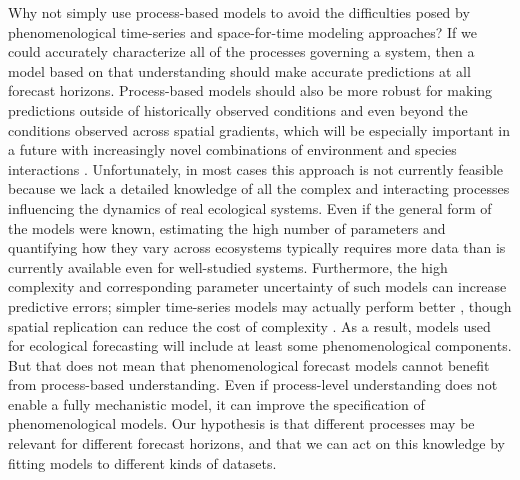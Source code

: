\documentclass[11pt]{article}
\begin{document}
Why not simply use process-based models to avoid the difficulties posed by phenomenological time-series and space-for-time modeling approaches? If we could accurately characterize all of the processes governing a system, then a model based on that understanding should make accurate predictions at all forecast horizons. Process-based models should also be more robust for making predictions outside of historically observed conditions and even beyond the conditions observed across spatial gradients, which will be especially important in a future with increasingly novel combinations of environment and species interactions \citep{Williams2007}. Unfortunately, in most cases this approach is not currently feasible because we lack a detailed knowledge of all the complex and interacting processes influencing the dynamics of real ecological systems. Even if the general form of the models were known, estimating the high number of parameters and quantifying how they vary across ecosystems typically requires more data than is currently available even for well-studied systems. Furthermore, the high complexity and corresponding parameter uncertainty of such models can increase predictive errors; simpler  time-series models may actually perform better \citep{ward_complexity_2014}, though spatial replication can reduce the cost of complexity \citep{Chevalier}. As a result, models used for ecological forecasting will include at least some phenomenological components. But that does not mean that phenomenological forecast models cannot benefit from process-based understanding. Even if process-level understanding does not enable a fully mechanistic model, it can improve the specification of phenomenological models. Our hypothesis is that different processes may be relevant for different forecast horizons, and that we can act on this knowledge by fitting models to different kinds of datasets. 
\end{document}
